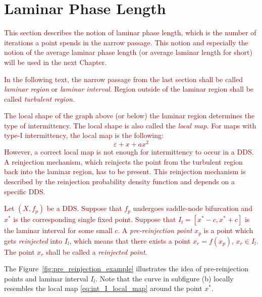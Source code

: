\section{Laminar Phase Length}

\textcolor{darkred}{
This section describes the notion of laminar phase length, which is the number of iterations a point spends in the narrow passage.
This notion and especially the notion of the average laminar phase length (or average laminar length for short) will be used in the next Chapter.
}
\par
\textcolor{darkred}{
In the following text, the narrow passage from the last section shall be called \emph{laminar region} or \emph{laminar interval}.
Region outside of the laminar region shall be called \emph{turbulent region}.
}
\par
\textcolor{darkred}{
The local shape of the graph above (or below) the laminar region determines the type of intermittency.
The local shape is also called the \emph{local map}.
For maps with type-I intermittency, the local map is the following:
\begin{equation}
\varepsilon + x + a x^2 \label{eq:int_I_local_map}
\end{equation}
However, a correct local map is not enough for intermittency to occur in a DDS.
A reinjection mechanism, which reinjects the point from the turbulent region back into the laminar region, has to be present.
This reinjection mechanism is described by the reinjection probability density function and depends on a specific DDS.
}
\par
\textcolor{darkred}{
Let $(X, f_{p})$ be a DDS. Suppose that $f_{p}$ undergoes saddle-node bifurcation and $x^{*}$ is the corresponding single fixed point.
Suppose that $I_l = [ x^{*}-c, x^{*}+c ]$ is the laminar interval for some small $c$.
A \emph{pre-reinjection point} $x_p$ is a point which gets \emph{reinjected} into $I_l$, which means that there exists a point $x_r = f(x_p)$, $x_r \in I_l$.
The point $x_r$ shall be called a \emph{reinjected point}.
}
\par
The Figure~\ref{fig:pre_reinjection_example} illustrates the idea of pre-reinjection points and laminar interval $I_l$.
Note that the curve in subfigure (b) locally resembles the local map \eqref{eq:int_I_local_map} around the point $x^{*}$.
